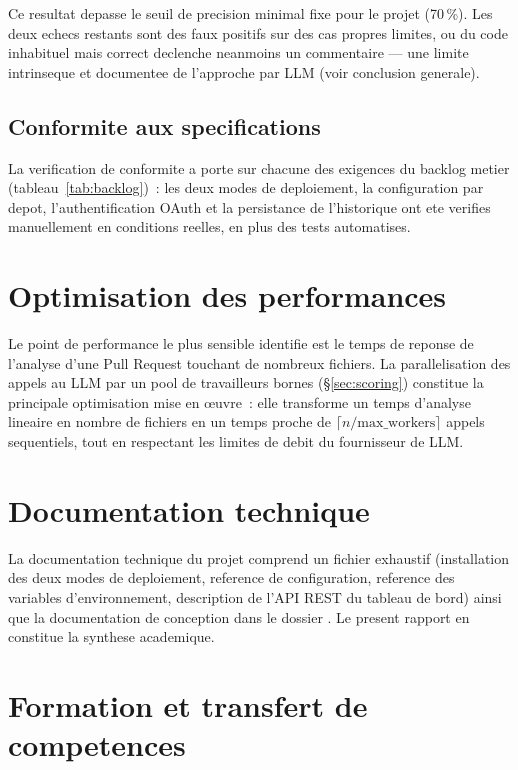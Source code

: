 \documentclass[a4paper,12pt,oneside]{report}
\begin{document}
Ce resultat depasse le seuil de precision minimal fixe pour le projet (70\,\%). Les deux echecs restants sont des faux positifs sur des cas \og propres \fg{} limites, ou du code inhabituel mais correct declenche neanmoins un commentaire --- une limite intrinseque et documentee de l'approche par LLM (voir conclusion generale).

\subsection{Conformite aux specifications}

La verification de conformite a porte sur chacune des exigences du backlog metier (tableau~\ref{tab:backlog})~: les deux modes de deploiement, la configuration par depot, l'authentification OAuth et la persistance de l'historique ont ete verifies manuellement en conditions reelles, en plus des tests automatises.

\section{Optimisation des performances}

Le point de performance le plus sensible identifie est le temps de reponse de l'analyse d'une Pull Request touchant de nombreux fichiers. La parallelisation des appels au LLM par un pool de travailleurs bornes (\S\ref{sec:scoring}) constitue la principale optimisation mise en \oe uvre~: elle transforme un temps d'analyse lineaire en nombre de fichiers en un temps proche de \(\lceil n / \text{max\_workers} \rceil\) appels sequentiels, tout en respectant les limites de debit du fournisseur de LLM.

\section{Documentation technique}

La documentation technique du projet comprend un fichier  exhaustif (installation des deux modes de deploiement, reference de configuration, reference des variables d'environnement, description de l'API REST du tableau de bord) ainsi que la documentation de conception dans le dossier . Le present rapport en constitue la synthese academique.

\section{Formation et transfert de competences}
\end{document}
